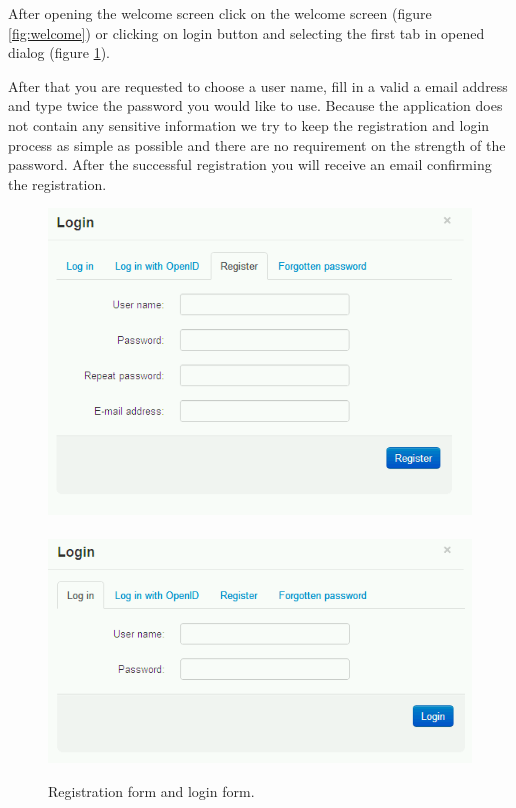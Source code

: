After opening the welcome screen click on the welcome screen (figure \ref{fig:welcome}) or clicking on login button and selecting the first tab in opened dialog (figure \ref{fig:register_login}).

After that you are requested to choose a user name, fill in a valid a email address and type twice the password you would like to use. Because the application does not contain any sensitive information we try to keep the registration and login process as simple as possible and there are no requirement on the strength of the password. After the successful registration you will receive an email confirming the registration.

\begin{figure}
\begin{center}
\includegraphics[scale=0.4]{figures/user_manual/register.png}~~~~\includegraphics[scale=0.4]{figures/user_manual/login.png}
\end{center}
\caption{Registration form and login form.}
\label{fig:register_login}
\end{figure}

